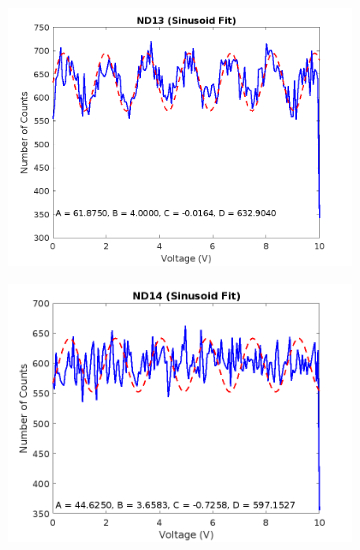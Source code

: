\documentclass{article}
\numberwithin{equation}{section}
\begin{document}
\begin{figure}[h]
    \centering
    \begin{subfigure}[b]{0.45\textwidth}
        \includegraphics[width=\textwidth]{ND13_sinusoid_fit.png}
    \end{subfigure}
    \hfill
    \begin{subfigure}[b]{0.45\textwidth}
        \includegraphics[width=\textwidth]{ND14_sinusoid_fit.png}
    \end{subfigure}
    \
    \begin{subfigure}[b]{0.45\textwidth}

\end{subfigure}
\end{figure}
\end{document}

